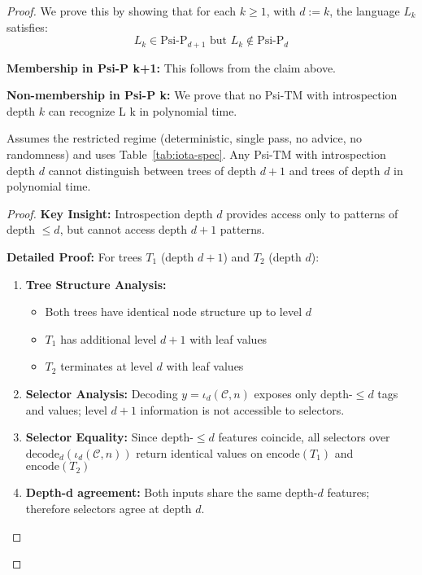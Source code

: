 \begin{proof}
We prove this by showing that for each $k \geq 1$, with $d:=k$, the language $L_k$ satisfies:
$$L_k \in \text{Psi-P}_{d+1} \text{ but } L_k \notin \text{Psi-P}_d$$

\textbf{Membership in Psi-P k+1:}
This follows from the claim above.

\textbf{Non-membership in Psi-P k:}
We prove that no Psi-TM with introspection depth $k$ can recognize L k in polynomial time.

\begin{lemma}
\label{lem:depth-d-limitation-2}
Assumes the restricted regime (deterministic, single pass, no advice, no randomness) and uses Table~\ref{tab:iota-spec}.
Any Psi-TM with introspection depth $d$ cannot distinguish between trees of depth $d+1$ and trees of depth $d$ in polynomial time.
\end{lemma}

\begin{proof}
\textbf{Key Insight:} Introspection depth $d$ provides access only to patterns of depth $\leq d$, but cannot access depth $d+1$ patterns.

\textbf{Detailed Proof:}
For trees $T_1$ (depth $d+1$) and $T_2$ (depth $d$):

\begin{enumerate}
\item \textbf{Tree Structure Analysis:}
  \begin{itemize}
  \item Both trees have identical node structure up to level $d$
  \item $T_1$ has additional level $d+1$ with leaf values
  \item $T_2$ terminates at level $d$ with leaf values
  \end{itemize}

\item \textbf{Selector Analysis:}
  Decoding $y=\iota_d(\mathcal{C},n)$ exposes only depth-$\le d$ tags and values; level $d{+}1$ information is not accessible to selectors.

\item \textbf{Selector Equality:}
  Since depth-$\le d$ features coincide, all selectors over $\mathrm{decode}_d(\iota_d(\mathcal{C},n))$ return identical values on $\text{encode}(T_1)$ and $\text{encode}(T_2)$

\item \textbf{Depth-d agreement:}
  Both inputs share the same depth-$d$ features; therefore selectors agree at depth $d$.


\end{enumerate}
\end{proof}
\end{proof}
